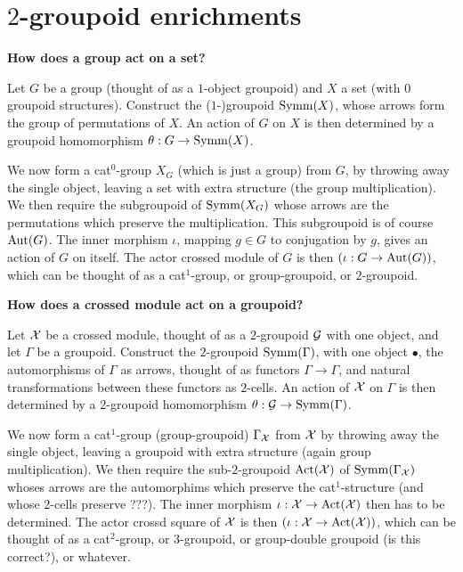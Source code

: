 

\section{$2$-groupoid enrichments}

\noindent
{\bf How does a group act on a set?}

Let $G$ be a group (thought of as a $1$-object groupoid) 
and $X$ a set (with $0$ groupoid structures). 
Construct the ($1$-)groupoid $\mathrm{Symm}(X)$, 
whose arrows form the group of permutations of $X$.
An action of $G$ on $X$ is then determined by a groupoid homomorphism 
$\theta : G \to \mathrm{Symm}(X)$.

We now form a cat$^0$-group $X_G$ (which is just a group) from $G$, 
by throwing away the single object, 
leaving a set with extra structure (the group multiplication). 
We then require the subgroupoid of $\mathrm{Symm}(X_G)$ whose arrows 
are the permutations which preserve the multiplication. 
This subgroupoid is of course $\mathrm{Aut}(G)$. 
The inner morphism $\iota$, mapping $g \in G$ to conjugation by $g$, 
gives an action of $G$ on itself. 
The actor crossed module of $G$ is then $(\iota : G \to \mathrm{Aut}(G))$, 
which can be thought of as a cat$^1$-group, 
or group-groupoid, or $2$-groupoid.

\bigskip\noindent
{\bf How does a crossed module act on a groupoid?} 

Let $\mathcal{X}$ be a crossed module, 
thought of as a $2$-groupoid $\mathcal{G}$ with one object, 
and let $\Gamma$ be a groupoid. 
Construct the $2$-groupoid $\mathrm{Symm}(\Gamma)$, with one object $\bullet$, 
the automorphisms of $\Gamma$ as arrows, 
thought of as functors $\Gamma \to \Gamma$, 
and natural transformations between these functors as $2$-cells. 
An action of $\mathcal{X}$ on $\Gamma$ is then determined by a 
$2$-groupoid homomorphism $\theta : \mathcal{G} \to \mathrm{Symm}(\Gamma)$.

We now form a cat$^1$-group (group-groupoid) $\Gamma_{\mathcal{X}}$ from $\mathcal{X}$ 
by throwing away the single object, 
leaving a groupoid with extra structure (again group multiplication).
We then require the sub-$2$-groupoid $\mathrm{Act}(\mathcal{X})$ 
of $\mathrm{Symm}(\Gamma_{\mathcal{X}})$ whoses arrows 
are the automorphims which preserve the cat$^1$-structure 
(and whose $2$-cells preserve ???). 
The inner morphism $\iota : \mathcal{X} \to \mathrm{Act}(\mathcal{X})$ then has to be determined.  
The actor crossd square of $\mathcal{X}$ is then 
$(\iota : \mathcal{X} \to \mathrm{Act}(\mathcal{X}))$, 
which can be thought of as a cat$^2$-group, 
or $3$-groupoid, or group-double groupoid (is this correct?), or whatever.

